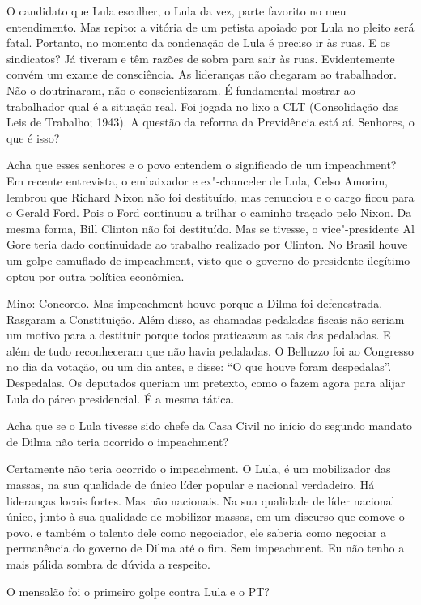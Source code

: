 \falaM O candidato que Lula escolher, o Lula da vez, parte favorito no meu
entendimento. Mas repito: a vitória de um petista apoiado por Lula no
pleito será fatal. Portanto, no momento da condenação de Lula é preciso
ir às ruas. E os sindicatos? Já tiveram e têm razões de sobra para sair
às ruas. Evidentemente convém um exame de consciência. As lideranças não
chegaram ao trabalhador. Não o doutrinaram, não o conscientizaram. É
fundamental mostrar ao trabalhador qual é a situação real. Foi jogada no
lixo a CLT (Consolidação das Leis de Trabalho; 1943). A questão da
reforma da Previdência está aí. Senhores, o que é isso?

\falaG Acha que esses senhores e o povo entendem o significado de um
impeachment? Em recente entrevista, o embaixador e ex"-chanceler de Lula,
Celso Amorim, lembrou que Richard Nixon não foi destituído, mas
renunciou e o cargo ficou para o Gerald Ford. Pois o Ford continuou a
trilhar o caminho traçado pelo Nixon. Da mesma forma, Bill Clinton não
foi destituído. Mas se tivesse, o vice"-presidente Al Gore teria dado
continuidade ao trabalho realizado por Clinton. No Brasil houve um golpe
camuflado de impeachment, visto que o governo do presidente ilegítimo
optou por outra política econômica.

Mino: Concordo. Mas impeachment houve porque a Dilma foi defenestrada.
Rasgaram a Constituição. Além disso, as chamadas pedaladas fiscais não
seriam um motivo para a destituir porque todos praticavam as tais das
pedaladas. E além de tudo reconheceram que não havia pedaladas. O
Belluzzo foi ao Congresso no dia da votação, ou um dia antes, e disse:
``O que houve foram despedalas''. Despedalas. Os deputados queriam um
pretexto, como o fazem agora para alijar Lula do páreo presidencial. É a
mesma tática.

\falaG Acha que se o Lula tivesse sido chefe da Casa Civil no início do
segundo mandato de Dilma não teria ocorrido o impeachment?

\falaM Certamente não teria ocorrido o impeachment. O Lula, é um mobilizador
das massas, na sua qualidade de único líder popular e nacional
verdadeiro. Há lideranças locais fortes. Mas não nacionais. Na sua
qualidade de líder nacional único, junto à sua qualidade de mobilizar
massas, em um discurso que comove o povo, e também o talento dele como
negociador, ele saberia como negociar a permanência do governo de Dilma
até o fim. Sem impeachment. Eu não tenho a mais pálida sombra de dúvida
a respeito.

\falaG O mensalão foi o primeiro golpe contra Lula e o PT?


